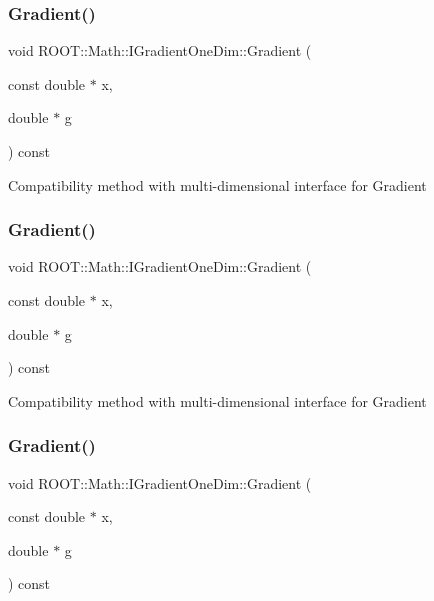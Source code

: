 \subsubsection{\texorpdfstring{Gradient()}{Gradient()}\hspace{0.1cm}{\footnotesize\ttfamily [1/3]}}
{\footnotesize\ttfamily void R\+O\+O\+T\+::\+Math\+::\+I\+Gradient\+One\+Dim\+::\+Gradient (\begin{DoxyParamCaption}\item[{const double $\ast$}]{x,  }\item[{double $\ast$}]{g }\end{DoxyParamCaption}) const\hspace{0.3cm}{\ttfamily [inline]}}

Compatibility method with multi-\/dimensional interface for Gradient \mbox{\label{classROOT_1_1Math_1_1IGradientOneDim_ac00c2cdc7a93ea4358f2f1df8e3499eb}} 
\subsubsection{\texorpdfstring{Gradient()}{Gradient()}\hspace{0.1cm}{\footnotesize\ttfamily [2/3]}}
{\footnotesize\ttfamily void R\+O\+O\+T\+::\+Math\+::\+I\+Gradient\+One\+Dim\+::\+Gradient (\begin{DoxyParamCaption}\item[{const double $\ast$}]{x,  }\item[{double $\ast$}]{g }\end{DoxyParamCaption}) const\hspace{0.3cm}{\ttfamily [inline]}}

Compatibility method with multi-\/dimensional interface for Gradient \mbox{\label{classROOT_1_1Math_1_1IGradientOneDim_ac00c2cdc7a93ea4358f2f1df8e3499eb}} 
\subsubsection{\texorpdfstring{Gradient()}{Gradient()}\hspace{0.1cm}{\footnotesize\ttfamily [3/3]}}
{\footnotesize\ttfamily void R\+O\+O\+T\+::\+Math\+::\+I\+Gradient\+One\+Dim\+::\+Gradient (\begin{DoxyParamCaption}\item[{const double $\ast$}]{x,  }\item[{double $\ast$}]{g }\end{DoxyParamCaption}) const\hspace{0.3cm}{\ttfamily [inline]}}

